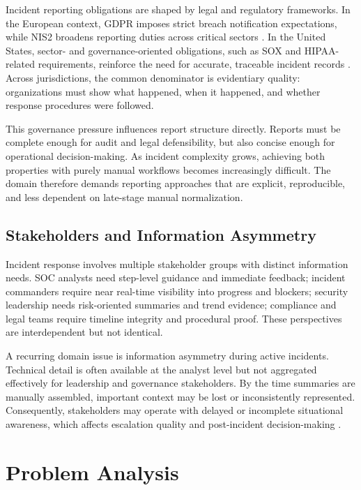 Incident reporting obligations are shaped by legal and regulatory frameworks. In the European context, GDPR imposes strict breach notification expectations, while NIS2 broadens reporting duties across critical sectors \cite{gdpr,nis2}. In the United States, sector- and governance-oriented obligations, such as SOX and HIPAA-related requirements, reinforce the need for accurate, traceable incident records \cite{sox,hipaa}. Across jurisdictions, the common denominator is evidentiary quality: organizations must show what happened, when it happened, and whether response procedures were followed.

This governance pressure influences report structure directly. Reports must be complete enough for audit and legal defensibility, but also concise enough for operational decision-making. As incident complexity grows, achieving both properties with purely manual workflows becomes increasingly difficult. The domain therefore demands reporting approaches that are explicit, reproducible, and less dependent on late-stage manual normalization.

\subsection{Stakeholders and Information Asymmetry}

Incident response involves multiple stakeholder groups with distinct information needs. SOC analysts need step-level guidance and immediate feedback; incident commanders require near real-time visibility into progress and blockers; security leadership needs risk-oriented summaries and trend evidence; compliance and legal teams require timeline integrity and procedural proof. These perspectives are interdependent but not identical.

A recurring domain issue is information asymmetry during active incidents. Technical detail is often available at the analyst level but not aggregated effectively for leadership and governance stakeholders. By the time summaries are manually assembled, important context may be lost or inconsistently represented. Consequently, stakeholders may operate with delayed or incomplete situational awareness, which affects escalation quality and post-incident decision-making \cite{isaca_survey_2021,ibm_breach_2023}.

\section{Problem Analysis}

